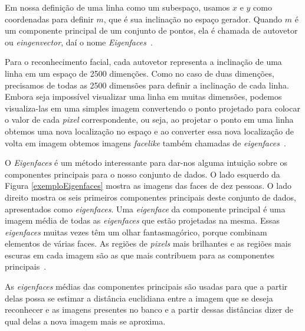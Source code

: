 Em nossa definição de uma linha como um subespaço, usamos $\displaystyle x$ e $\displaystyle y$ como coordenadas para definir $\displaystyle m$, que é sua inclinação no espaço gerador. Quando $\displaystyle m$ é um componente principal de um conjunto de pontos, ela é chamada de autovetor ou \textit{eingenvector}, daí o nome \textit{Eigenfaces}~\cite{hewitt}. 

Para o reconhecimento facial, cada autovetor representa a inclinação de uma linha em um espaço de 2500 dimenções. Como no caso de duas dimenções, precisamos de todas as 2500 dimensões para definir a inclinação de cada linha. Embora seja impossível visualizar uma linha em muitas dimensões, podemos visualiza-las em uma simples imagem convertendo o ponto projetado para colocar o valor de cada \textit{pixel} correspondente, ou seja, ao projetar o ponto em uma linha obtemos uma nova localização no espaço e ao converter essa nova localização de volta em imagem obtemos imagens \textit{facelike} também chamadas de \textit{eigenfaces}~\cite{hewitt}.

O \textit{Eigenfaces} é um método interessante para dar-nos alguma intuição sobre os componentes principais para o nosso conjunto de dados. O lado esquerdo da Figura \ref{exemploEigenfaces} mostra as imagens das faces de dez pessoas. O lado direito  mostra os seis primeiros componentes principais deste conjunto de dados, apresentados como \textit{eigenfaces}. Uma \textit{eigenface} da componente principal é uma imagem média de todas as \textit{eigenfaces} que estão projetadas na mesma. Essas \textit{eigenfaces} muitas vezes têm um olhar fantasmagórico, porque combinam elementos de várias faces. As regiões de \textit{pixels} mais brilhantes e as regiões mais escuras em cada imagem são as que mais contribuem para as componentes principais~\cite{hewitt}. 

As \textit{eigenfaces} médias das componentes principais são usadas para que a partir delas possa se estimar a distância euclidiana entre a imagem que se deseja reconhecer e as imagens presentes no banco e a partir dessas distâncias dizer de qual delas a nova imagem mais se aproxima.


